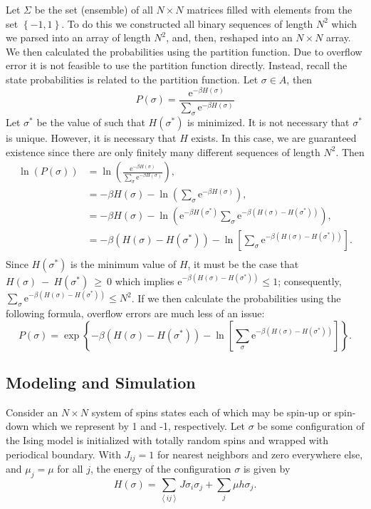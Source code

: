 \documentclass{llncs}
\newcommand{\ee}[1]{\ensuremath{\textrm{e}^{#1}}}
\begin{document}
Let $\Sigma$ be the set (ensemble) of all $N\times N$ matrices filled with elements from the set $\left\{-1,1\right\}$. To do this we constructed all binary sequences of length $N^2$ which we parsed into an array of length $N^2$, and, then, reshaped into an $N\times N$ array. We then calculated the probabilities using the partition function. Due to overflow error it is not feasible to use the partition function directly. Instead, recall the state probabilities is related to the partition function. Let $\sigma\in A$, then 
\begin{equation}
P(\sigma) = \frac{\ee{-\beta H(\sigma)}}{\sum_{\sigma}\ee{-\beta H(\sigma)}}
\end{equation}
Let $\sigma^*$ be the value of such that $H(\sigma^*)$ is minimized. It is not necessary that $\sigma^*$ is unique. However, it is necessary that $H$ exists. In this case, we are guaranteed existence since there are only finitely many different sequences of length $N^2$. Then 
\begin{align}
\ln(P(\sigma)) &= \ln\left(\frac{\ee{-\beta H(\sigma)}}{\sum_{\sigma}\ee{-\beta H(\sigma)}}\right)\nonumber,\\
&= -\beta H(\sigma)-\ln\left(\sum_{\sigma}\ee{-\beta H(\sigma)}\right)\nonumber,\\
&= -\beta H(\sigma)-\ln\left(\ee{-\beta H(\sigma^*)}\sum_{\sigma}\ee{-\beta (H(\sigma)-H(\sigma^*))}\right)\nonumber,\\
&= -\beta (H(\sigma)-H(\sigma^*))-\ln\left[\sum_{\sigma}\ee{-\beta (H(\sigma)-H(\sigma^*))}\right].\\
\end{align}
Since $H(\sigma^*)$ is the minimum value of $H$, it must be the case that $H(\sigma)~-~H(\sigma^*)~\geq~0$ which implies $\ee{-\beta(H(\sigma)-H(\sigma^*))}\leq 1$; consequently, $\sum_{\sigma}\ee{-\beta (H(\sigma)-H(\sigma^*))}\leq N^2$. If we then calculate the probabilities using the following formula, overflow errors are much less of an issue:
\begin{equation}
P(\sigma) = \exp\left\{-\beta (H(\sigma)-H(\sigma^*))-\ln\left[\sum_{\sigma}\ee{-\beta (H(\sigma)-H(\sigma^*))}\right]\right\}.
\end{equation}

\newpage
\subsection{Modeling and Simulation}
\setcounter{equation}{0}
\renewcommand{\theequation}{2.1.\arabic{equation}}
Consider an $N\times N$ system of spins states each of which may be spin-up or spin-down which we represent by 1 and -1, respectively. Let $\sigma$ be some configuration of the Ising model is initialized with totally random spins and wrapped with periodical boundary. With $J_{ij}=1$ for nearest neighbors and zero everywhere else, and $\mu_j=\mu$ for all $j$, the energy of the configuration $\sigma$ is given by 
\begin{equation} 
H(\sigma)=\sum_{\left<ij\right>}J\sigma_i\sigma_j+\sum_j\mu h\sigma_j.
\end{equation}
\end{document}
